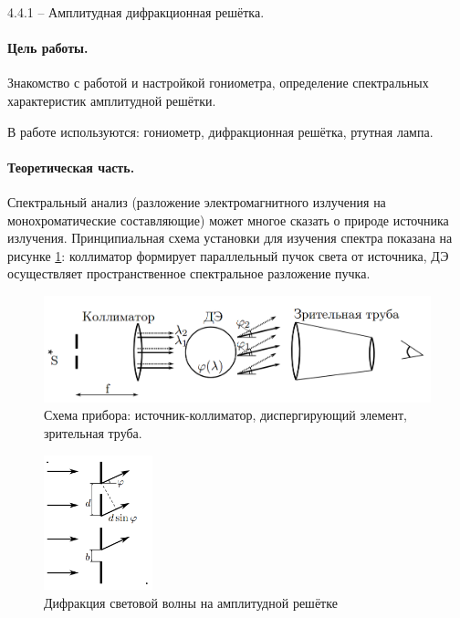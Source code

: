 \documentclass{../lab_class}
\begin{document}
{\Large 4.4.1 -- Амплитудная дифракционная решётка.}

\paragraph{Цель работы.}
Знакомство с работой и настройкой гониометра, определение спектральных характеристик амплитудной решётки.

В работе используются: гониометр, дифракционная решётка, ртутная лампа.

\paragraph{Теоретическая часть.}
Спектральный анализ (разложение электромагнитного излучения на монохроматические составляющие) может многое сказать о природе источника излучения. Принципиальная схема установки для изучения спектра показана на рисунке \ref{fig:scheme}: коллиматор формирует параллельный пучок света от источника, ДЭ осуществляет пространственное спектральное разложение пучка. 

\begin{figure}[H]
	\centering
	\includegraphics[width=12cm]{scheme.png}
	\caption{Схема прибора: источник-коллиматор, диспергирующий элемент, зрительная труба.}
	\label{fig:scheme}
\end{figure}

\begin{figure}
  \vspace{-20pt}
  \begin{center}
    \includegraphics[width=0.28\textwidth]{lattice.png}
  \end{center}
  \vspace{-20pt}
  \caption{Дифракция световой волны на амплитудной решётке}
  \label{fig:lattice}
  \vspace{-10pt}
\end{figure}
\end{document}
